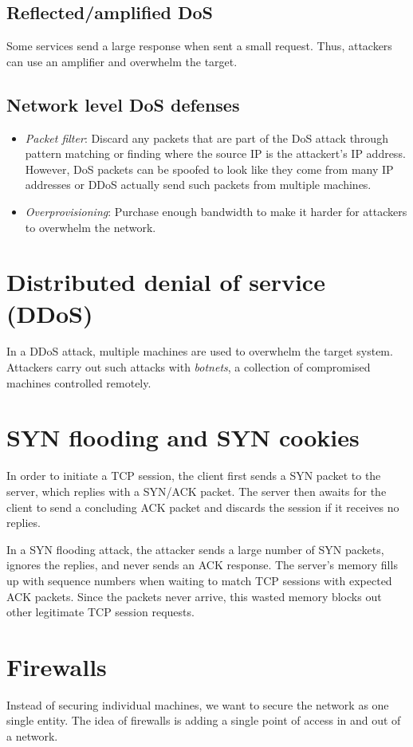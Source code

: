  \subsection{Reflected/amplified DoS}
 Some services send a large response when sent a small request. Thus, attackers can use an amplifier and overwhelm the target.
 
 \subsection{Network level DoS defenses}
 \begin{itemize}
     \item \emph{Packet filter}: Discard any packets that are part of the DoS attack through pattern matching or finding where the source IP is the attackert's IP address. However, DoS packets can be spoofed to look like they come from many IP addresses or DDoS actually send such packets from multiple machines.
     \item \emph{Overprovisioning}: Purchase enough bandwidth to make it harder for attackers to overwhelm the network.
 \end{itemize}
 
 \section{Distributed denial of service (DDoS)}
 In a DDoS attack, multiple machines are used to overwhelm the target system. Attackers carry out such attacks with \emph{botnets}, a collection of compromised machines controlled remotely.
 
\section{SYN flooding and SYN cookies}
In order to initiate a TCP session, the client first sends a SYN packet to the server, which replies with a SYN/ACK packet. The server then awaits for the client to send a concluding ACK packet and discards the session if it receives no replies. 

\medskip
In a SYN flooding attack, the attacker sends a large number of SYN packets, ignores the replies, and never sends an ACK response. The server's memory fills up with sequence numbers when waiting to match TCP sessions with expected ACK packets. Since the packets never arrive, this wasted memory blocks out other legitimate TCP session requests.

\section{Firewalls}
Instead of securing individual machines, we want to secure the network as one single entity. The idea of firewalls is adding a single point of access in and out of a network.

